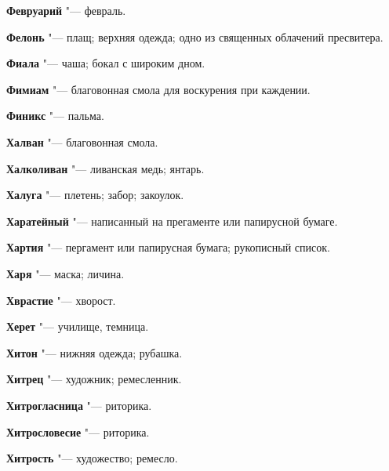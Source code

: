 \begin{mymulticols}{2}
\noindent\textbf{Февруарий} "--- февраль. 




\noindent\textbf{Фелонь} "--- плащ; верхняя одежда; одно из священных облачений пресвитера. 




\noindent\textbf{Фиала} "--- чаша; бокал с широким дном. 




\noindent\textbf{Фимиам} "--- благовонная смола для воскурения при каждении. 




\noindent\textbf{Финикс} "--- пальма. 




\bukvaending






\noindent\textbf{Халван} "--- благовонная смола. 




\noindent\textbf{Халколиван} "--- ливанская медь; янтарь. 




\noindent\textbf{Халуга} "--- плетень; забор; закоулок. 




\noindent\textbf{Харатейный} "--- написанный на прегаменте или папирусной бумаге. 




\noindent\textbf{Хартия} "--- пергамент или папирусная бумага; рукописный список. 




\noindent\textbf{Харя} "--- маска; личина. 




\noindent\textbf{Хврастие} "--- хворост. 




\noindent\textbf{Херет} "--- училище, темница. 




\noindent\textbf{Хитон} "--- нижняя одежда; рубашка. 




\noindent\textbf{Хитрец} "--- художник; ремесленник. 




\noindent\textbf{Хитрогласница} "--- риторика. 




\noindent\textbf{Хитрословесие} "--- риторика. 




\noindent\textbf{Хитрость} "--- художество; ремесло. 





\end{mymulticols}
